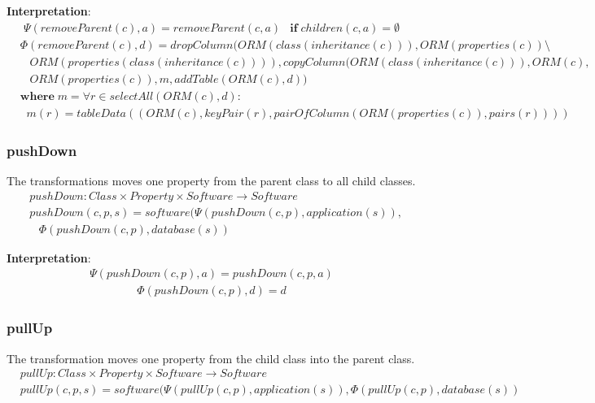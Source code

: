 \documentclass[10pt]{article}
\begin{document}
\noindent \textbf{Interpretation}:
\begin{align}
\Psi(removeParent(c), a) = removeParent(c, a)
& \mathbf{if} \; children(c, a) = \emptyset
\end{align}
\begin{align}
&\Phi(removeParent(c), d) = 
 dropColumn(ORM(class(inheritance(c))), ORM(properties(c)) \setminus \nonumber \\ 
& \;\;\; ORM(properties(class(inheritance(c)))), copyColumn(ORM(class(inheritance(c))), ORM(c), \nonumber \\ 
& \;\;\; ORM(properties(c)), m, 
addTable(ORM(c), d)) \nonumber \\
& \mathbf{where} \; m = \forall r \in selectAll(ORM(c), d) : \nonumber \\  
& \;\; m(r) = tableData((ORM(c), keyPair(r), pairOfColumn(ORM(properties(c)), pairs(r))))  
\end{align}

\subsubsection{pushDown}
The transformations moves one property from the parent class to all child classes.
\begin{align}
& pushDown: Class \times Property \times Software \rightarrow Software \nonumber \\
& pushDown(c, p, s) = software(\Psi(pushDown(c, p), application(s)), \nonumber \\
& \;\;\; \Phi(pushDown(c, p), database(s))
\end{align}

\noindent \textbf{Interpretation}:
\begin{align}
\Psi(pushDown(c, p), a) = pushDown(c, p, a)
\end{align}
\begin{align}
\Phi(pushDown(c, p), d) = d
\end{align}

\subsubsection{pullUp}
The transformation moves one property from the child class into the parent class.
\begin{align}
& pullUp: Class \times Property \times Software \rightarrow Software \nonumber \\
& pullUp(c, p, s) = software(\Psi(pullUp(c, p), application(s)), \Phi(pullUp(c, p), database(s))
\end{align}
\end{document}
